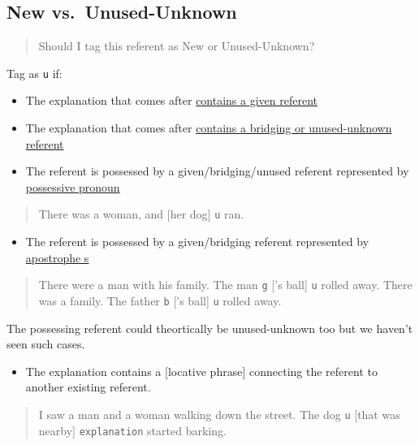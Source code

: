 \documentclass[
]{book}
\providecommand{\tightlist}{%
  \setlength{\itemsep}{0pt}\setlength{\parskip}{0pt}}
\begin{document}
\hypertarget{new-vs.-unused-unknown}{%
\subsection{New vs.~Unused-Unknown}\label{new-vs.-unused-unknown}}

\begin{quote}
Should I tag this referent as New or Unused-Unknown?
\end{quote}

Tag as \texttt{u} if:

\begin{itemize}
\item
  The explanation that comes after \protect\hyperlink{explanation-given-referent}{contains a given referent}
\item
  The explanation that comes after \protect\hyperlink{explanation-bridging-or-unused-unknown-referent}{contains a bridging or unused-unknown referent}
\item
  The referent is possessed by a given/bridging/unused referent represented by \protect\hyperlink{possessive-pronouns}{possessive pronoun}
\end{itemize}

\begin{quote}
There was a woman, and {[}her dog{]} \texttt{u} ran.
\end{quote}

\begin{itemize}
\tightlist
\item
  The referent is possessed by a given/bridging referent represented by \protect\hyperlink{apostrophe-s}{apostrophe s}
\end{itemize}

\begin{quote}
There were a man with his family. The man \texttt{g} {[}'s ball{]} \texttt{u} rolled away.
There was a family. The father \texttt{b} {[}'s ball{]} \texttt{u} rolled away.
\end{quote}

The possessing referent could theortically be unused-unknown too but we haven't seen such cases.

\begin{itemize}
\tightlist
\item
  The explanation contains a {[}locative phrase{]}
  connecting the referent to another existing referent.
\end{itemize}

\begin{quote}
I saw a man and a woman walking down the street.
The dog \texttt{u} {[}that was nearby{]} \texttt{explanation} started barking.
\end{quote}
\end{document}
